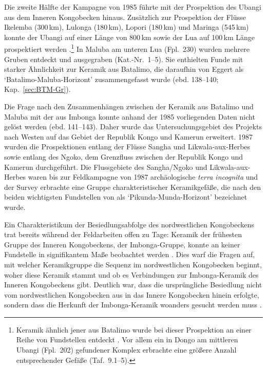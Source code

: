 \begin{multicols}{2}
Die zweite Hälfte der Kampagne von 1985 führte mit der Prospektion des \mbox{Ubangi} aus dem Inneren Kongobecken hinaus. Zusätzlich zur Prospektion der Flüsse Ikelemba (300\,km), Lulonga (180\,km), Lopori (180\,km) und Maringa (545\,km) konnte der \mbox{Ubangi} auf einer Länge von 800\,km sowie der Lua auf 100\,km Länge prospektiert werden \parencite[129]{Eggert.1987c}.\footnote{Keramik ähnlich jener aus Batalimo \parencites{deBayledesHermens.1975}{Aumassip.1975} wurde bei dieser Prospektion an einer Reihe von Fundstellen entdeckt \parencite[134 Abb.~4; siehe Kap.~\ref{sec:BTM-Gr}]{Eggert.1987c}. Vor allem ein in Dongo am mittleren \mbox{Ubangi} (Fpl.~202) gefundener Komplex erbrachte eine größere Anzahl entsprechender Gefäße (Taf.~9.1--5).} In Maluba am unteren Lua (Fpl.~230) wurden mehrere Gruben entdeckt und ausgegraben (Kat.-Nr.~1--5). Sie enthielten Funde mit starker Ähnlichkeit zur Keramik aus Batalimo, die daraufhin von Eggert als \enquote*{Batalimo-Maluba-Horizont} zusammengefasst wurde (ebd. 138--140; Kap.~\ref{sec:BTM-Gr}).

Die Frage nach den Zusammenhängen zwischen der Keramik aus Batalimo und Maluba mit der aus Imbonga konnte anhand der 1985 vorliegenden Daten nicht gelöst werden (ebd. 141--143). Daher wurde das Untersuchungsgebiet des Projekts nach Westen auf das Gebiet der Republik Kongo und Kamerun erweitert. 1987 wurden die Prospektionen entlang der Flüsse \mbox{Sangha} und \mbox{Likwala}-\mbox{aux}-\mbox{Herbes} sowie entlang des \mbox{Ngoko}, dem Grenzfluss zwischen der Republik Kongo und Kamerun durchgeführt. Die Flussgebiete des \mbox{Sangha}/\mbox{Ngoko} und \mbox{Likwala}-\mbox{aux}-\mbox{Herbes} waren bis zur Feldkampagne von 1987 archäologische \textit{terra incognita} und der Survey erbrachte eine Gruppe charakteristischer Keramikgefäße, die nach den beiden wichtigsten Fundstellen von \textcite[16\,f.]{Eggert.1992} als \enquote*{Pikunda-Munda-Horizont} bezeichnet wurde.

Ein Charakteristikum der Besiedlungsabfolge des nordwestlichen Kongobeckens trat bereits während der Feldarbeiten offen zu Tage: Keramik der frühesten Gruppe des Inneren Kongobeckens, der Imbonga-Gruppe, konnte an keiner Fundstelle in signifikantem Maße beobachtet werden \parencite[4; siehe Kap.~\ref{sec:IMB-Gr}]{Eggert.1987c}. Dies warf die Fragen auf, mit welcher Keramikgruppe die Sequenz im nordwestlichen Kongobecken beginnt, woher diese Keramik stammt und ob es Verbindungen zur Imbonga-Keramik des Inneren Kongobeckens gibt. Deutlich war, dass die ursprüngliche Besiedlung nicht vom nordwestlichen Kongobecken aus in das Innere Kongobecken hinein erfolgte, sondern dass die Herkunft der Imbonga-Keramik woanders gesucht werden muss \parencite[257 Anm.~49]{Wotzka.1995}.


\end{multicols}
